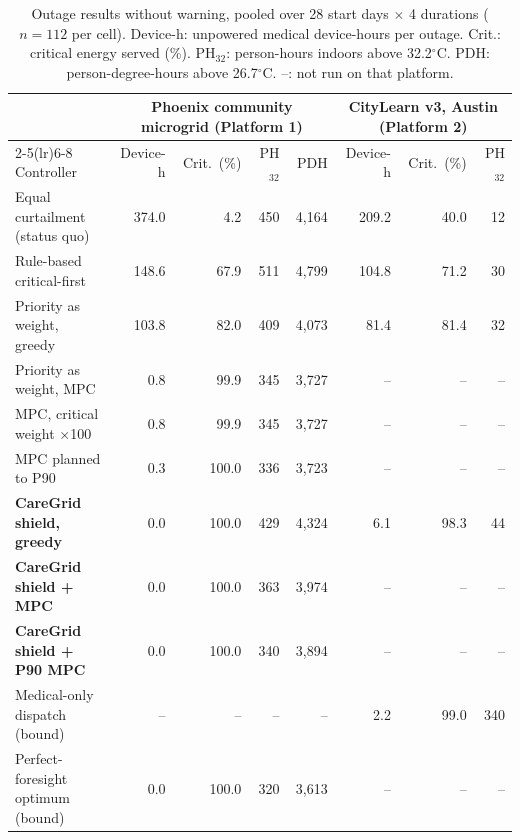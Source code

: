 \begin{table}[t]
\centering
\caption{Outage results without warning, pooled over 28 start days $\times$ 4 durations ($n=112$ per cell). Device-h: unpowered medical device-hours per outage. Crit.: critical energy served (\%). PH$_{32}$: person-hours indoors above 32.2$^\circ$C. PDH: person-degree-hours above 26.7$^\circ$C. --: not run on that platform.}
\label{tab:main}
\begin{tabular}{lrrrrrrr}
\toprule
 & \multicolumn{4}{c}{Phoenix community microgrid (Platform 1)} & \multicolumn{3}{c}{CityLearn v3, Austin (Platform 2)} \\
\cmidrule(lr){2-5}\cmidrule(lr){6-8}
Controller & Device-h & Crit.\ (\%) & PH$_{32}$ & PDH & Device-h & Crit.\ (\%) & PH$_{32}$ \\
\midrule
Equal curtailment (status quo) & 374.0 & 4.2 & 450 & 4{,}164 & 209.2 & 40.0 & 12 \\
Rule-based critical-first & 148.6 & 67.9 & 511 & 4{,}799 & 104.8 & 71.2 & 30 \\
Priority as weight, greedy & 103.8 & 82.0 & 409 & 4{,}073 & 81.4 & 81.4 & 32 \\
Priority as weight, MPC & 0.8 & 99.9 & 345 & 3{,}727 & -- & -- & -- \\
\quad MPC, critical weight $\times$100 & 0.8 & 99.9 & 345 & 3{,}727 & -- & -- & -- \\
\quad MPC planned to P90 & 0.3 & 100.0 & 336 & 3{,}723 & -- & -- & -- \\
\textbf{CareGrid shield, greedy} & 0.0 & 100.0 & 429 & 4{,}324 & 6.1 & 98.3 & 44 \\
\textbf{CareGrid shield + MPC} & 0.0 & 100.0 & 363 & 3{,}974 & -- & -- & -- \\
\textbf{CareGrid shield + P90 MPC} & 0.0 & 100.0 & 340 & 3{,}894 & -- & -- & -- \\
Medical-only dispatch (bound) & -- & -- & -- & -- & 2.2 & 99.0 & 340 \\
Perfect-foresight optimum (bound) & 0.0 & 100.0 & 320 & 3{,}613 & -- & -- & -- \\
\bottomrule
\end{tabular}
\end{table}
